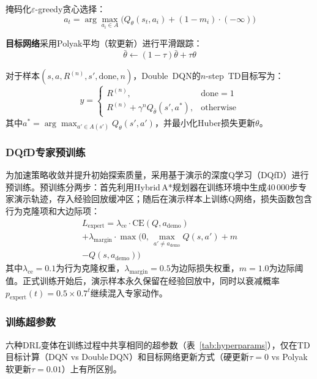 \documentclass[twocolumn]{elsarticle}
\begin{document}
掩码化$\varepsilon$-greedy贪心选择：
\begin{equation}
  a_t = \arg\max_{a_i\in A}\bigl(Q_\theta(s_t,a_i) + (1-m_i)\cdot(-\infty)\bigr)
\end{equation}

\textbf{目标网络}采用Polyak平均（软更新）进行平滑跟踪：
\begin{equation}
  \bar{\theta} \leftarrow (1-\tau)\bar{\theta} + \tau\theta
\end{equation}

对于样本$(s,a,R^{(n)},s',\text{done},n)$，Double~DQN的$n$-step~TD目标写为：
\begin{equation}
  y = \begin{cases} R^{(n)}, & \text{done}=1 \\ R^{(n)}+\gamma^n Q_{\bar{\theta}}(s',a^*), & \text{otherwise} \end{cases}
\end{equation}
其中$a^* = \arg\max_{a'\in A(s')}Q_\theta(s',a')$，并最小化Huber损失更新$\theta$。

\subsubsection{DQfD专家预训练}

为加速策略收敛并提升初始探索质量，采用基于演示的深度Q学习（DQfD）进行预训练。预训练分两步：首先利用Hybrid\,A*规划器在训练环境中生成40\,000步专家演示轨迹，存入经验回放缓冲区；随后在演示样本上训练Q网络，损失函数包含行为克隆项和大边际项：
\begin{multline}
  L_{\text{expert}} = \lambda_{\text{ce}} \cdot \text{CE}(Q, a_{\text{demo}}) \\
  + \lambda_{\text{margin}} \cdot \max\bigl(0,\, \max_{a'\neq a_{\text{demo}}} Q(s,a') + m \\
  - Q(s,a_{\text{demo}})\bigr)
\end{multline}
其中$\lambda_{\text{ce}}=0.1$为行为克隆权重，$\lambda_{\text{margin}}=0.5$为边际损失权重，$m=1.0$为边际阈值。正式训练开始后，演示样本永久保留在经验回放中，同时以衰减概率$p_{\text{expert}}(t) = 0.5 \times 0.7^t$继续混入专家动作。

\subsubsection{训练超参数}

六种DRL变体在训练过程中共享相同的超参数（表~\ref{tab:hyperparams}），仅在TD目标计算（DQN vs Double\,DQN）和目标网络更新方式（硬更新$\tau=0$ vs Polyak软更新$\tau=0.01$）上有所区别。
\end{document}
